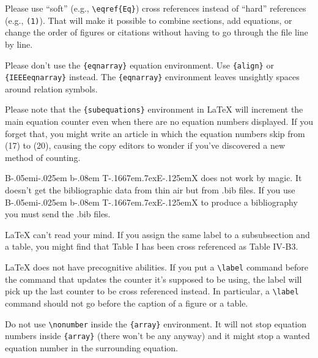 \documentclass[conference]{IEEEtran}
\def\BibTeX{{\rm B\kern-.05em{\sc i\kern-.025em b}\kern-.08em
    T\kern-.1667em\lower.7ex\hbox{E}\kern-.125emX}}
\begin{document}
Please use ``soft'' (e.g., \verb|\eqref{Eq}|) cross references instead
of ``hard'' references (e.g., \verb|(1)|). That will make it possible
to combine sections, add equations, or change the order of figures or
citations without having to go through the file line by line.

Please don't use the \verb|{eqnarray}| equation environment. Use
\verb|{align}| or \verb|{IEEEeqnarray}| instead. The \verb|{eqnarray}|
environment leaves unsightly spaces around relation symbols.

Please note that the \verb|{subequations}| environment in {\LaTeX}
will increment the main equation counter even when there are no
equation numbers displayed. If you forget that, you might write an
article in which the equation numbers skip from (17) to (20), causing
the copy editors to wonder if you've discovered a new method of
counting.

{\BibTeX} does not work by magic. It doesn't get the bibliographic
data from thin air but from .bib files. If you use {\BibTeX} to produce a
bibliography you must send the .bib files. 

{\LaTeX} can't read your mind. If you assign the same label to a
subsubsection and a table, you might find that Table I has been cross
referenced as Table IV-B3. 

{\LaTeX} does not have precognitive abilities. If you put a
\verb|\label| command before the command that updates the counter it's
supposed to be using, the label will pick up the last counter to be
cross referenced instead. In particular, a \verb|\label| command
should not go before the caption of a figure or a table.

Do not use \verb|\nonumber| inside the \verb|{array}| environment. It
will not stop equation numbers inside \verb|{array}| (there won't be
any anyway) and it might stop a wanted equation number in the
surrounding equation.
\end{document}
